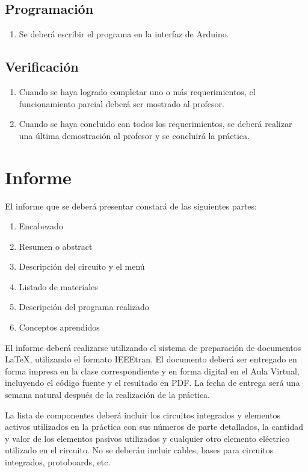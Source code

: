 \documentclass[12pt,letterpaper]{IEEEtran}
\begin{document}
\subsection{Programación}

\begin{enumerate}[resume]
	\item Se deberá escribir el programa en la interfaz de Arduino.
\end{enumerate}

\subsection{Verificación}

\begin{enumerate}[resume]
	\item Cuando se haya logrado completar uno o más requerimientos, el funcionamiento parcial deberá ser mostrado al profesor.
	\item Cuando se haya concluido con todos los requerimientos, se deberá realizar una última demostración al profesor y se concluirá la práctica.
\end{enumerate}


\section{Informe}

El informe que se deberá presentar constará de las siguientes partes:

\begin{enumerate}
  \item Encabezado
  \item Resumen o abstract
  \item Descripción del circuito y el menú
  \item Listado de materiales
  \item Descripción del programa realizado
  \item Conceptos aprendidos
\end{enumerate}

El informe deberá realizarse utilizando el sistema de preparación de documentos \LaTeX, utilizando el formato IEEEtran. El documento deberá ser entregado en forma impresa en la clase correspondiente y en forma digital en el Aula Virtual, incluyendo el código fuente y el resultado en PDF.  La fecha de entrega será una semana natural después de la realización de la práctica.

La lista de componentes deberá incluir los circuitos integrados y elementos activos utilizados en la práctica con sus números de parte detallados, la cantidad y valor de los elementos pasivos utilizados y cualquier otro elemento eléctrico utilizado en el circuito. No se deberán incluir cables, bases para circuitos integrados, protoboards, etc.
\end{document}
